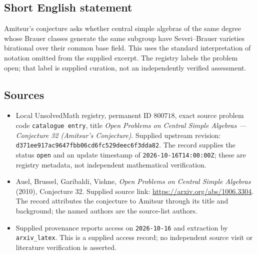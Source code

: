 \documentclass[11pt]{article}
\begin{document}
\subsection{Short English statement}
Amitsur's conjecture asks whether central simple algebras of the same degree whose Brauer classes generate the same subgroup have Severi--Brauer varieties birational over their common base field. This uses the standard interpretation of notation omitted from the supplied excerpt. The registry labels the problem open; that label is supplied curation, not an independently verified assessment.
\subsection{Sources}
\begin{itemize}
\item Local UnsolvedMath registry, permanent ID \(800718\), exact source problem code \texttt{catalogue entry}, title \emph{Open Problems on Central Simple Algebras --- Conjecture 32 (Amitsur's Conjecture)}. Supplied upstream revision: \texttt{d371ee917ac9647fbb06cd6fc529deec6f3dda82}. The record supplies the status \texttt{open} and an update timestamp of \texttt{2026-10-16T14:00:00Z}; these are registry metadata, not independent mathematical verification.
\item Auel, Brussel, Garibaldi, Vishne, \emph{Open Problems on Central Simple Algebras} (2010), Conjecture 32. Supplied source link: \url{https://arxiv.org/abs/1006.3304}. The record attributes the conjecture to Amitsur through its title and background; the named authors are the source-list authors.
\item Supplied provenance reports access on \texttt{2026-10-16} and extraction by \texttt{arxiv\_latex}. This is a supplied access record; no independent source visit or literature verification is asserted.
\end{itemize}
\end{document}
